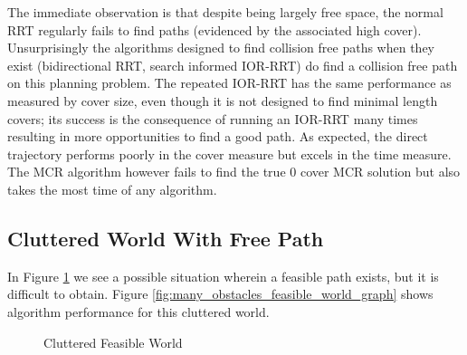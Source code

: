 The immediate observation is that despite being largely free space, the normal RRT regularly fails to find paths (evidenced by the associated high cover). Unsurprisingly the algorithms designed to find collision free paths when they exist (bidirectional RRT, search informed IOR-RRT) do find a collision free path on this planning problem. The repeated IOR-RRT has the same performance as measured by cover size, even though it is not designed to find minimal length covers; its success is the consequence of running an IOR-RRT many times resulting in more opportunities to find a good path. As expected, the direct trajectory performs poorly in the cover measure but excels in the time measure. The MCR algorithm however fails to find the true 0 cover MCR solution but also takes the most time of any algorithm.

\subsection{Cluttered World With Free Path}
In Figure \ref{fig:many_obstacles_feasible_world} we see a possible situation wherein a feasible path exists, but it is difficult to obtain. Figure \ref{fig:many_obstacles_feasible_world_graph} shows algorithm performance for this cluttered world.

\begin{figure}[!h]
    \hfill
    \caption{Cluttered Feasible World}
    \label{fig:many_obstacles_feasible_world}
\end{figure}



